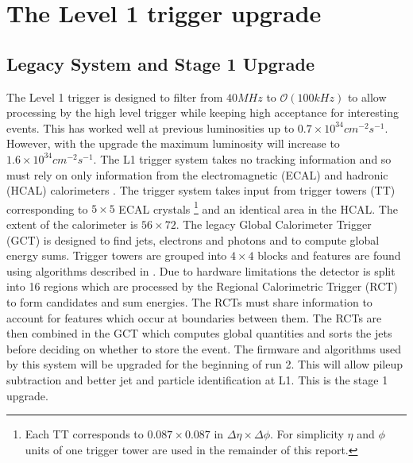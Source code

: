 \chapter{The Level 1 trigger upgrade} %

\section{Legacy System and Stage 1 Upgrade}
The Level 1 trigger is designed to filter from $40MHz$ to $\mathcal{O}(100kHz)$ to allow processing by the high level trigger while keeping high acceptance for interesting events. This has worked well at previous luminosities up to $0.7\times10^{34} cm^{-2}s^{-1}$. However, with the upgrade the maximum luminosity will increase to $1.6\times10^{34} cm^{-2}s^{-1}$. The L1 trigger system takes no tracking information and so must rely on only information from the electromagnetic (ECAL) and hadronic (HCAL) calorimeters \cite{gct}. The trigger system takes input from  trigger towers (TT) corresponding to $5\times5$ ECAL crystals \footnote{Each TT corresponds to $0.087\times0.087$ in $\Delta\eta\times\Delta\phi$. For simplicity $\eta$ and $\phi$ units of one trigger tower are used in the remainder of this report.} and an identical area in the HCAL. The extent of the calorimeter is $56\times72$. The legacy Global Calorimeter Trigger (GCT) is designed to find jets, electrons and photons and to compute global energy sums. Trigger towers are grouped into $4\times4$ blocks and features are found using algorithms described in \cite{gctalgo}. Due to hardware limitations the detector is split into 16 regions which are processed by the Regional Calorimetric Trigger (RCT) to form candidates and sum energies. The RCTs must share information to account for features which occur at boundaries between them. The RCTs are then combined in the GCT which computes global quantities and sorts the jets before deciding on whether to store the event. The firmware and algorithms used by this system will be upgraded for the beginning of run 2. This will allow pileup subtraction and better jet and particle identification at L1. This is the stage 1 upgrade. 
